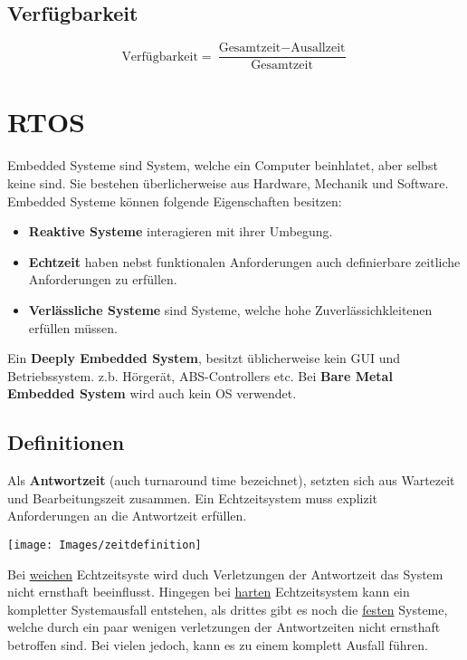 \subsection{Verfügbarkeit}
\[
\text{Verfügbarkeit} = \dfrac{\text{Gesamtzeit} - \text{Ausallzeit}}{\text{Gesamtzeit}}
\]

\section{RTOS}
Embedded Systeme sind System, welche ein Computer beinhlatet, aber selbst keine sind. Sie bestehen überlicherweise aus Hardware, Mechanik und Software. Embedded Systeme können folgende Eigenschaften besitzen:
\begin{itemize}
	\item \textbf{Reaktive Systeme} interagieren mit ihrer Umbegung.
	\item \textbf{Echtzeit} haben nebst funktionalen Anforderungen auch definierbare zeitliche Anforderungen zu erfüllen.
	\item \textbf{Verlässliche Systeme} sind Systeme, welche hohe Zuverlässichkleitenen erfüllen müssen.
\end{itemize}

Ein \textbf{Deeply Embedded System}, besitzt üblicherweise kein GUI und Betriebssystem. z.b. Hörgerät, ABS-Controllers etc. Bei \textbf{Bare Metal Embedded System} wird auch kein OS verwendet.

\subsection{Definitionen}
Als \textbf{Antwortzeit} (auch turnaround time bezeichnet), setzten sich aus Wartezeit und Bearbeitungszeit zusammen. Ein Echtzeitsystem muss explizit Anforderungen an die Antwortzeit erfüllen. 
\begin{center}
	\texttt{[image: Images/zeitdefinition]}
\end{center}

Bei \underline{weichen} Echtzeitsyste wird duch Verletzungen der Antwortzeit das System nicht ernsthaft beeinflusst. Hingegen bei \underline{harten} Echtzeitsystem kann ein kompletter Systemausfall entstehen, als drittes gibt es noch die \underline{festen} Systeme, welche durch ein paar 
wenigen verletzungen der Antwortzeiten nicht ernsthaft betroffen sind. Bei vielen jedoch, kann es zu einem komplett Ausfall führen.

